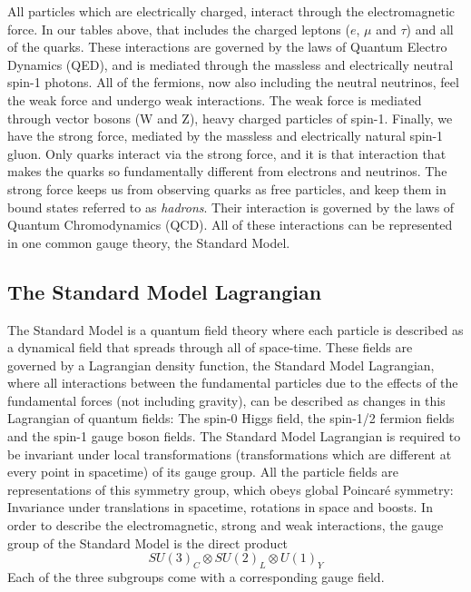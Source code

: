 All particles which are electrically charged, interact through the electromagnetic force. In our tables above, that includes the charged leptons ($e$, $\mu$ and $\tau$) and all of the quarks. These interactions are governed by the laws of Quantum Electro Dynamics (QED), and is mediated through the massless and electrically neutral spin-1 photons. All of the fermions, now also including the neutral neutrinos, feel the weak force and undergo weak interactions. The weak force is mediated through vector bosons (W and Z), heavy charged particles of spin-1. Finally, we have the strong force, mediated by the massless and electrically natural spin-1 gluon. Only quarks interact via the strong force, and it is that interaction that makes the quarks so fundamentally different from electrons and neutrinos. The strong force keeps us from observing quarks as free particles, and keep them in bound states referred to as \emph{hadrons}. Their interaction is governed by the laws of Quantum Chromodynamics (QCD). All of these interactions can be represented in one common gauge theory, the Standard Model.
\subsection{The Standard Model Lagrangian}
\label{sec:theory:gauge}
The Standard Model is a quantum field theory where each particle is described as a dynamical field that spreads through all of space-time. These fields are governed by a Lagrangian density function, the Standard Model Lagrangian, where all interactions between the fundamental particles due to the effects of the fundamental forces (not including gravity), can be described as changes in this Lagrangian of quantum fields: The spin-0 Higgs field, the spin-1/2 fermion fields and the spin-1 gauge boson fields. The Standard Model Lagrangian is required to be invariant under local transformations (transformations which are different at every point in spacetime) of its gauge group. All the particle fields are representations of this symmetry group, which obeys global Poincaré symmetry: Invariance under translations in spacetime, rotations in space and boosts. In order to describe the electromagnetic, strong and weak interactions, the gauge group of the Standard Model is the direct product
\begin{equation}
  SU(3)_C \otimes SU (2)_L \otimes U(1)_Y
  \end{equation}
Each of the three subgroups come with a corresponding gauge field.
